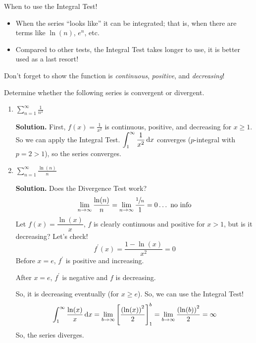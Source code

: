 \begin{Remark}{}{}
    When to use the Integral Test!
    \begin{itemize}
        \item When the series ``looks like'' it can be integrated; that is, when there
              are terms like $ \ln(n) $, $ e^n $, etc.
        \item Compared to other tests, the Integral Test takes longer to use, it is better used
              as a last resort!
    \end{itemize}
\end{Remark}

\begin{Remark}{}{}
    Don't forget to show the function is \emph{continuous}, \emph{positive}, and
    \emph{decreasing}!
\end{Remark}

\begin{Example}{}{}
    Determine whether the following series is convergent or divergent.
    \begin{enumerate}[label=(\roman*)]
        \item $ \displaystyle \sum\limits_{n=1}^{\infty} \frac{1}{n^2} $

              \textbf{Solution.} First, $ \displaystyle  f(x)=\frac{1}{x^2} $ is continuous, positive,
              and decreasing for $ x\geqslant 1 $. So we can apply the Integral Test.
              $ \displaystyle \int_{1}^{\infty} \frac{1}{x^2} \odif{x} $ converges ($ p $-integral
              with $ p=2>1 $), so the series converges.
        \item $  \displaystyle\sum\limits_{n=1}^{\infty} \frac{\ln(n)}{n} $

              \textbf{Solution.} Does the Divergence Test work?
              \[ \lim\limits_{{n} \to {\infty}} \frac{\ln(n)}{n}=
                  \lim\limits_{{n} \to {\infty}} \frac{\sfrac{1}{n}}{1} =0\ldots\text{ no info} \]
              Let $ f(x)=\dfrac{\ln(x)}{x} $, $ f $ is clearly continuous and positive for $ x>1 $,
              but is it decreasing? Let's check!
              \[ f^\prime(x)=\frac{1-\ln(x)}{x^2}=0 \]
              Before $ x=e $, $ f^\prime $ is positive and increasing.

              After $ x=e $, $ f^\prime $ is negative
              and $ f $ is decreasing.

              So, it is decreasing eventually (for $ x\geqslant e $). So,
              we can use the Integral Test!
              \[ \int_{1}^{\infty} \frac{\ln(x)}{x} \odif{x}
                  =\lim\limits_{{b} \to {\infty}} \left[ \frac{\left( \ln(x) \right)^2}{2} \right]_1^b
                  =\lim\limits_{{b} \to {\infty}} \frac{\left( \ln(b) \right)^2}{2}=\infty   \]
              So, the series diverges.
    \end{enumerate}
\end{Example}

